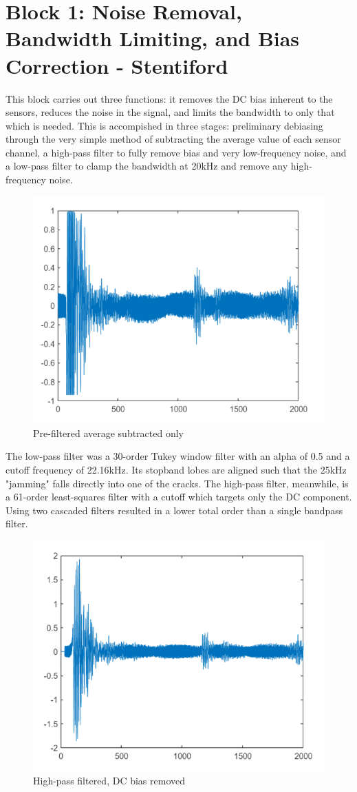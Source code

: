 
\section{Block 1: Noise Removal, Bandwidth Limiting, and Bias Correction - Stentiford}

This block carries out three functions: it removes the DC bias inherent to the sensors, reduces the noise
 in the signal, and limits the bandwidth to only that which is needed. This is accompished in three stages:
 preliminary debiasing through the very simple method of subtracting the average value of each sensor channel,
 a high-pass filter to fully remove bias and very low-frequency noise, and a low-pass filter to clamp the
 bandwidth at 20kHz and remove any high-frequency noise. 

\begin{figure}[H]
    \centering
    \includegraphics[width=0.5\linewidth]{figures/prefiltered.PNG}
    \caption{Pre-filtered average subtracted only}
\end{figure}
 
The low-pass filter was a 30-order Tukey window filter
with an alpha of 0.5 and a cutoff frequency of 22.16kHz. Its stopband lobes are aligned such that the 25kHz
"jamming" falls directly into one of the cracks. The high-pass filter, meanwhile, is a 61-order least-squares
 filter with a cutoff which targets only the DC component. Using two cascaded filters resulted in a lower total
 order than a single bandpass filter.

\begin{figure}[H]
    \centering
    \includegraphics[width=0.5\linewidth]{figures/debiased.PNG}
    \caption{High-pass filtered, DC bias removed}
\end{figure}

